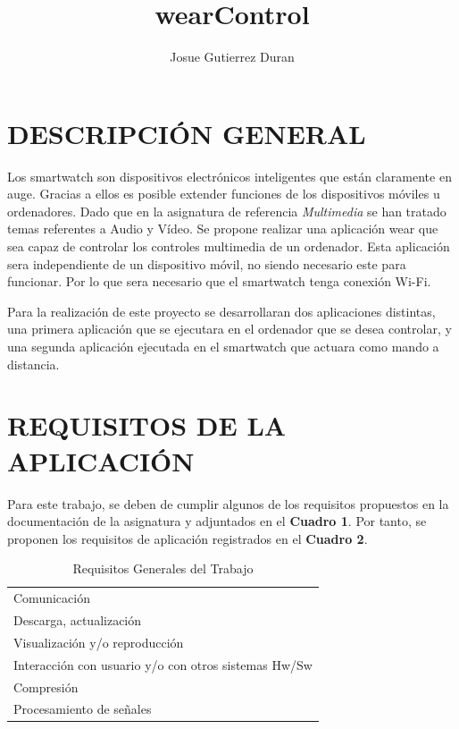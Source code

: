 \documentclass{documentation}
\title{wearControl}
\author{Josue Gutierrez Duran}
\begin{document}
\maketitle
\tableofcontents

\newpage

\section{DESCRIPCIÓN GENERAL}


Los smartwatch son dispositivos electrónicos inteligentes que están claramente en auge. Gracias a ellos es posible extender funciones de los dispositivos móviles u ordenadores. Dado que en la asignatura de referencia \textit{Multimedia} se han tratado temas referentes a Audio y Vídeo. Se propone realizar una aplicación wear que sea capaz de controlar los controles multimedia de un ordenador. Esta aplicación sera independiente de un dispositivo móvil, no siendo necesario este para funcionar. Por lo que sera necesario que el smartwatch tenga conexión Wi-Fi. 
\newline
\par
\noindent
Para la realización de este proyecto se desarrollaran dos aplicaciones distintas, una primera aplicación que se ejecutara en el ordenador que se desea controlar, y una segunda aplicación ejecutada en el smartwatch que actuara como mando a distancia.

\section{REQUISITOS DE LA APLICACIÓN}

Para este trabajo, se deben de cumplir algunos de los requisitos propuestos en la documentación de la asignatura y adjuntados en el \textbf{Cuadro 1}. Por tanto, se proponen los requisitos de aplicación registrados en el \textbf{Cuadro 2}.

\begin{table}[hp]
  \centering
  \caption{Requisitos Generales del Trabajo}
  \label{tab:tec-especifica}

  \begin{tabular}{p{}}
    \hline
    Comunicación \\
    Descarga, actualización \\
    Visualización y/o reproducción \\
    Interacción con usuario y/o con otros sistemas Hw/Sw \\
    Compresión \\
    Procesamiento de señales \\
    \hline
  \end{tabular}
\end{table}
\end{document}

